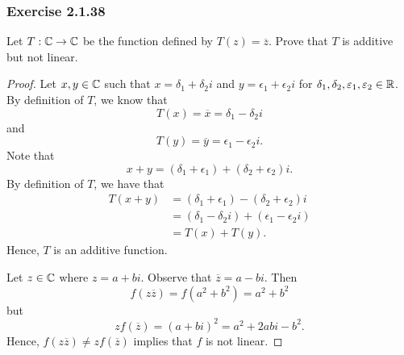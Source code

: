 \subsubsection{Exercise 2.1.38}\label{Exercise 2.1.38} Let \( T: \mathbb{C} \to \mathbb{C}  \) be the function defined by \( T(z) = \overline{z} \). Prove that \( T  \) is additive but not linear.
\begin{proof}
Let \( x,y \in \mathbb{C}   \) such that \( x = \delta_{1} + \delta_{2}i  \) and \( y = \epsilon_{1} + \epsilon_{2} i  \) for \( \delta_{1}, \delta_{2}, \varepsilon_{1}, \varepsilon_{2} \in \mathbb{R} \). By definition of \( T  \), we know that
\[  T(x) = \overline{x} = \delta _{1} - \delta_{2}i \]
and 
\[ T(y) = \overline{y} = \epsilon_{1} - \epsilon_{2}i. \]
Note that 
\[  x + y = (\delta_{1} + \epsilon _{1}    ) + (\delta_{2} + \epsilon_{2} )i. \]
By definition of \( T  \), we have that
\begin{align*} 
T(x+y) &= (\delta _{1} + \epsilon _{1}) - (\delta _{2} + \epsilon _{2} )i \\
       &= (\delta _{1} - \delta _{2}i ) + (\epsilon _{1} - \epsilon _{2} i) \\
       &= T(x) + T(y).
\end{align*}
Hence, \( T  \) is an additive function.

Let \( z \in \mathbb{C}  \) where \( z = a + bi  \). Observe that \( \overline{z} = a - bi  \). Then 
\[  f(z \overline{z}) = f(a^{2} + b^{2}) = a^{2} + b^{2}  \]
but
\[  z f(\overline{z}) = (a+bi)^{2} = a^{2} + 2abi - b^{2}. \]
Hence, \( f(z \overline{z}) \neq z f(\overline{z}) \) implies that \( f \) is not linear.
\end{proof}

